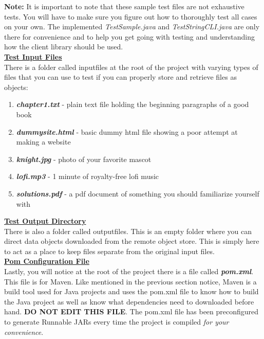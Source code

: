 \documentclass{article}
\begin{document}
\noindent \textbf{Note:} It is important to note that these sample test files are not exhaustive tests. You will have to make sure you figure out how to thoroughly test all cases on your own. The implemented \textit{TestSample.java} and \textit{TestStringCLI.java} are only there for convenience and to help you get going with testing and understanding how the client library should be used.\\

\noindent \textbf{\underline{Test Input Files}} \vspace{0.2cm} \\
\noindent There is a folder called inputfiles at the root of the project with varying types of files that you can use to test if you can properly store and retrieve files as objects:
\begin{enumerate}
    \item \textbf{\textit{chapter1.txt}} - plain text file holding the beginning paragraphs of a good book
    \item \textbf{\textit{dummysite.html}} - basic dummy html file showing a poor attempt at making a website
    \item \textbf{\textit{knight.jpg}} - photo of your favorite mascot
    \item \textbf{\textit{lofi.mp3}} - 1 minute of royalty-free lofi music 
    \item \textbf{\textit{solutions.pdf}} - a pdf document of something you should familiarize yourself with\\
\end{enumerate}

\noindent \textbf{\underline{Test Output Directory}} \vspace{0.2cm} \\
\noindent There is also a folder called outputfiles. This is an empty folder where you can direct data objects downloaded from the remote object store. This is simply here to act as a place to keep files separate from the original input files. \\

\noindent \textbf{\underline{Pom Configuration File}} \vspace{0.2cm} \\
\noindent Lastly, you will notice at the root of the project there is a file called \textbf{\textit{pom.xml}}. This file is for Maven. Like mentioned in the previous section notice, Maven is a build tool used for Java projects and uses the pom.xml file to know how to build the Java project as well as know what dependencies need to downloaded before hand. \textbf{DO NOT EDIT THIS FILE}. The pom.xml file has been preconfigured to generate Runnable JARs every time the project is compiled \textit{for your convenience}. 
\end{document}
